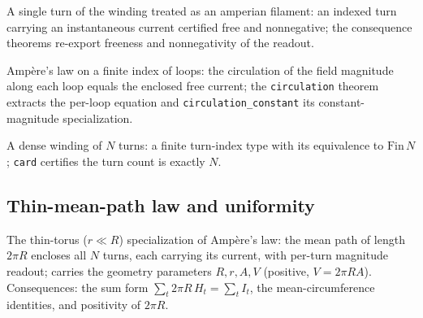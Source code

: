 \begin{definition}
\label{def:IPhO2026Problems_problem_IPhO_2026_3_A_1:AmperianFilament}
A single turn of the winding treated as an amperian filament: an indexed
turn carrying an instantaneous current certified free and nonnegative;
the consequence theorems re-export freeness and nonnegativity of the
readout.
\end{definition}

\begin{definition}
\label{def:IPhO2026Problems_problem_IPhO_2026_3_A_1:AmpereLaw}
Ampère's law on a finite index of loops: the circulation of the field
magnitude along each loop equals the enclosed free current; the
\texttt{circulation} theorem extracts the per-loop equation and
\texttt{circulation\_constant} its constant-magnitude specialization.
\end{definition}

\begin{definition}
\label{def:IPhO2026Problems_problem_IPhO_2026_3_A_1:FiniteWinding}
A dense winding of $N$ turns: a finite turn-index type with its equivalence
to $\mathrm{Fin}\,N$; \texttt{card} certifies the turn count is exactly $N$.
\end{definition}

\subsection*{Thin-mean-path law and uniformity}

\begin{definition}
\label{def:IPhO2026Problems_problem_IPhO_2026_3_A_1:AmpereLawThinMeanPath}
The thin-torus ($r \ll R$) specialization of Ampère's law: the mean path of
length $2\pi R$ encloses all $N$ turns, each carrying its
current, with per-turn magnitude readout; carries the geometry parameters
$R, r, A, V$ (positive, $V = 2\pi R A$). Consequences: the sum form
$\sum_t 2\pi R\, H_t = \sum_t I_t$, the mean-circumference identities, and
positivity of $2\pi R$.
\end{definition}


